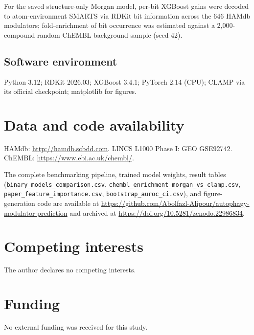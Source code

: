 \documentclass[11pt]{article}
\begin{document}
For the saved structure-only Morgan model, per-bit XGBoost gains were
decoded to atom-environment SMARTS via RDKit bit information across the 646
HAMdb modulators; fold-enrichment of bit occurrence was estimated against a
2{,}000-compound random ChEMBL background sample (seed 42).

\subsection*{Software environment}

Python 3.12; RDKit 2026.03; XGBoost 3.4.1; PyTorch 2.14 (CPU); CLAMP via its
official checkpoint; matplotlib for figures.

\section*{Data and code availability}

HAMdb: \url{http://hamdb.scbdd.com}. LINCS L1000 Phase I: GEO GSE92742.
ChEMBL: \url{https://www.ebi.ac.uk/chembl/}. {\sloppy The complete benchmarking
pipeline, trained model weights, result tables (\texttt{binary\_models\_comparison.csv},
\texttt{chembl\_enrichment\_morgan\_vs\_clamp.csv}, \texttt{paper\_feature\_importance.csv},
\texttt{bootstrap\_auroc\_ci.csv}), and figure-generation code are available
at \url{https://github.com/Abolfazl-Alipour/autophagy-modulator-prediction}
and archived at \url{https://doi.org/10.5281/zenodo.22986834}.\par}

\section*{Competing interests}

The author declares no competing interests.

\section*{Funding}

No external funding was received for this study.
\end{document}
